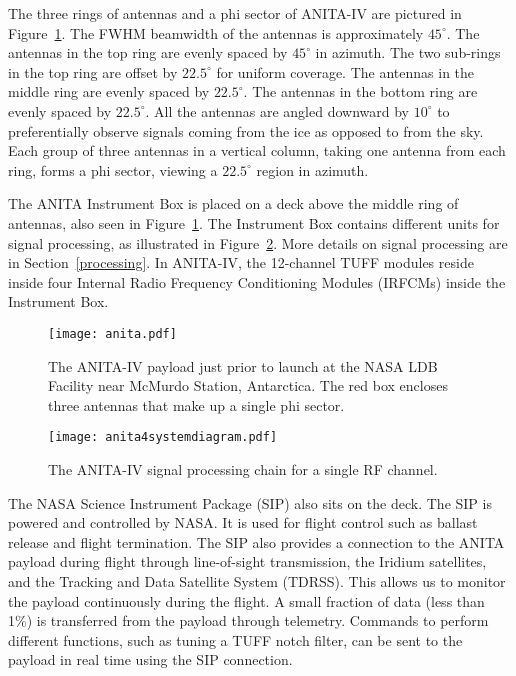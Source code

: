 \documentclass[preprint,12pt]{elsarticle}
\begin{document}
The three rings of antennas and a phi sector of ANITA-IV are pictured in Figure~\ref{anita}. 
The FWHM beamwidth of the antennas is approximately $45^{\circ}$. 
The antennas in the top ring are evenly spaced by $45^{\circ}$ in azimuth. 
The two sub-rings in the top ring are offset by $22.5^{\circ}$ for uniform coverage.
The antennas in the middle ring are evenly spaced by $22.5^{\circ}$.
The antennas in the bottom ring are evenly spaced by $22.5^{\circ}$.
All the antennas are angled downward by $10^{\circ}$ to preferentially observe signals coming from the ice as opposed to from the sky. 
Each group of three antennas in a vertical column, taking one antenna from each ring, forms a phi sector, viewing a $22.5^{\circ}$ region in azimuth. 

The ANITA Instrument Box is placed on a deck above the middle ring of antennas, also seen in Figure~\ref{anita}. 
The Instrument Box contains different units for signal processing, as illustrated in Figure~\ref{system}. 
More details on signal processing are in Section~\ref{processing}. 
In ANITA-IV, the 12-channel TUFF modules reside inside four Internal Radio Frequency Conditioning Modules (IRFCMs) inside the Instrument Box.

\begin{figure}[H]
\centering
\texttt{[image: anita.pdf]}
\caption{The ANITA-IV payload just prior to launch at the NASA LDB Facility near McMurdo Station, Antarctica. The red box encloses three antennas that make up a single phi sector.}
\label{anita}
\end{figure}

\begin{figure}[H]
\centering
\texttt{[image: anita4systemdiagram.pdf]}
\caption{The ANITA-IV signal processing chain for a single RF channel.}
\label{system}
\end{figure}

The NASA Science Instrument Package (SIP) also sits on the deck.
The SIP is powered and controlled by NASA.
It is used for flight control such as ballast release and flight termination. 
The SIP also provides a connection to the ANITA payload during flight through line-of-sight transmission, the Iridium satellites, and the Tracking and Data Satellite System (TDRSS). 
This allows us to monitor the payload continuously during the flight.
A small fraction of data (less than 1\%) is transferred from the payload through telemetry.
Commands to perform different functions, such as tuning a TUFF notch filter, 
can be sent to the payload in real time using the SIP connection. 
\end{document}
